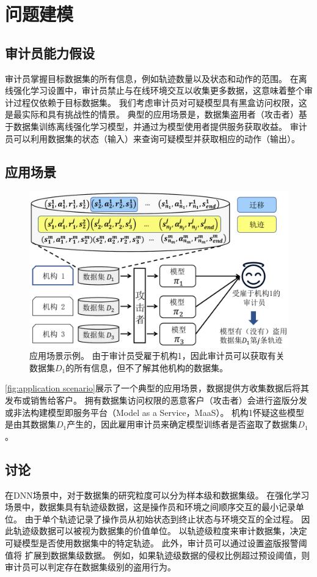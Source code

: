 


\section{问题建模}
\label{sec:overview}
\subsection{审计员能力假设}
审计员掌握目标数据集的所有信息，例如轨迹数量以及状态和动作的范围。
在离线强化学习设置中，审计员禁止与在线环境交互以收集更多数据，这意味着整个审计过程仅依赖于目标数据集。
我们考虑审计员对可疑模型具有黑盒访问权限，这是最实际和具有挑战性的情景。
典型的应用场景是，数据集盗用者（攻击者）基于数据集训练离线强化学习模型，并通过为模型使用者提供服务获取收益。
审计员可以利用数据集的状态（输入）来查询可疑模型并获取相应的动作（输出）。

\subsection{应用场景}
\begin{figure}[!t]
    \centering
    \includegraphics[width=0.7\hsize]{figure/orl_auditor/system-v1ch.pdf}
    \caption{应用场景示例。
    由于审计员受雇于机构1，因此审计员可以获取有关数据集$D_1$的所有信息，但不了解其他机构的数据集。}
    \label{fig:application scenario}
\end{figure}
\autoref{fig:application scenario}展示了一个典型的应用场景，数据提供方收集数据后将其发布或销售给客户。
拥有数据集访问权限的恶意客户（攻击者）会进行盗版分发或非法构建模型即服务平台（Model as a Service，MaaS）。
机构1怀疑这些模型是由其数据集$D_1$产生的，因此雇用审计员来确定模型训练者是否盗取了数据集$D_1$。

\subsection{讨论}
在DNN场景中，对于数据集的研究粒度可以分为样本级和数据集级。
在强化学习场景中，数据集具有轨迹级数据，这是操作员和环境之间顺序交互的最小记录单位。
由于单个轨迹记录了操作员从初始状态到终止状态与环境交互的全过程。
因此轨迹级数据可以被视为数据集的价值单位。
\sysnameo 以轨迹级粒度来审计数据集，决定可疑模型是否使用数据集中的特定轨迹。
此外，审计员可以通过设置盗版报警阈值将 \sysnameo 扩展到数据集级数据。
例如，如果轨迹级数据的侵权比例超过预设阈值，则审计员可以判定存在数据集级别的盗用行为。


